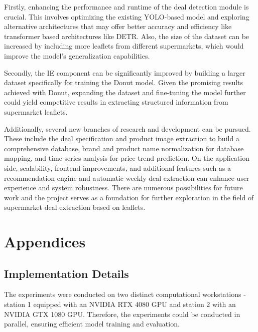\documentclass[11pt]{article}
\begin{document}
    Firstly, enhancing the performance and runtime of the deal detection module is crucial. This involves optimizing the existing YOLO-based model and exploring alternative architectures that may offer better accuracy and efficiency like transformer based architectures like DETR. Also, the size of the dataset can be increased by including more leaflets from different supermarkets, which would improve the model's generalization capabilities.

    Secondly, the IE component can be significantly improved by building a larger dataset specifically for training the Donut model. Given the promising results achieved with Donut, expanding the dataset and fine-tuning the model further could yield competitive results in extracting structured information from supermarket leaflets.

    Additionally, several new branches of research and development can be pursued. These include the deal specification and product image extraction to build a comprehensive database, brand and product name normalization for database mapping, and time series analysis for price trend prediction. On the application side, scalability, frontend improvements, and additional features such as a recommendation engine and automatic weekly deal extraction can enhance user experience and system robustness. There are numerous possibilities for future work and the project serves as a foundation for further exploration in the field of supermarket deal extraction based on leaflets.

\newpage

\newpage

\appendix
\section*{Appendices}
\renewcommand{\thesubsection}{\Alph{subsection}}

\subsection{Implementation Details}
\label{app:implementation_details}

The experiments were conducted on two distinct computational workstations - station 1 equipped with an NVIDIA RTX 4080 GPU and station 2 with an NVIDIA GTX 1080 GPU. Therefore, the experiments could be conducted in parallel, ensuring efficient model training and evaluation.
\end{document}
